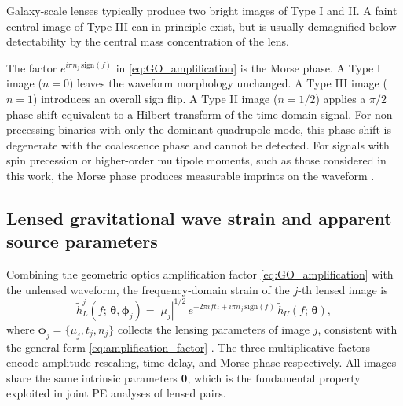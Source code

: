 Galaxy-scale lenses typically produce two bright images of Type I and II. A faint central image of Type III can in principle exist, but is usually demagnified below detectability by the central mass concentration of the lens.

The factor $e^{i\pi n_j\,\mathrm{sign}(f)}$ in \eqref{eq:GO_amplification}
is the Morse phase. A Type I image ($n=0$) leaves 
the waveform morphology unchanged. A Type III image ($n=1$) 
introduces an overall sign flip. A Type II image ($n=1/2$) 
applies a $\pi/2$ phase shift equivalent to a Hilbert 
transform of the time-domain signal. For non-precessing 
binaries with only the dominant quadrupole mode, this phase 
shift is degenerate with the coalescence phase and cannot 
be detected. For signals with spin precession or 
higher-order multipole moments, such as those considered in this work, the Morse phase produces 
measurable imprints on the waveform \cite{Lensing_phase_effects}.

\subsection{Lensed gravitational wave strain and apparent 
source parameters}

Combining the geometric optics amplification factor 
\eqref{eq:GO_amplification} with the unlensed waveform, 
the frequency-domain strain of the $j$-th lensed image is
\begin{equation}
    \tilde{h}^j_L(f;\,\boldsymbol{\theta},\boldsymbol{\phi}_j)
    = |\mu_j|^{1/2}\,
    e^{-2\pi i f t_j + i\pi n_j\,\mathrm{sign}(f)}\,
    \tilde{h}_U(f;\,\boldsymbol{\theta}),
    \label{eq:lensed_strain}
\end{equation}
where $\boldsymbol{\phi}_j = \{\mu_j, t_j, n_j\}$ 
collects the lensing parameters of image $j$, consistent 
with the general form \eqref{eq:amplification_factor} \cite{theligoscientificcollaboration2026gwtc40searchesgravitationalwavelensing}. The three multiplicative factors encode amplitude rescaling, time delay, and Morse phase respectively. All images share the same intrinsic parameters $\boldsymbol{\theta}$, which is the fundamental property exploited in joint PE analyses of lensed pairs.

